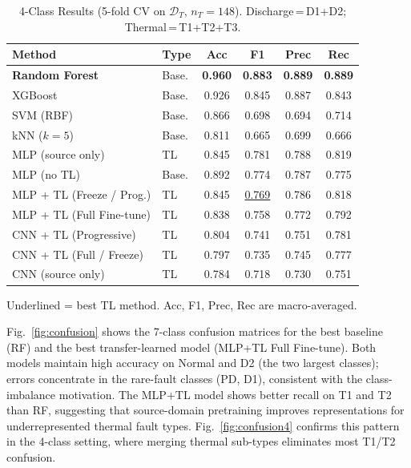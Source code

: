 \documentclass[conference]{IEEEtran}
\begin{document}
\begin{table}[t]
  \centering
  \caption{4-Class Results (5-fold CV on $\mathcal{D}_T$, $n_T=148$).
           Discharge\,=\,D1+D2; Thermal\,=\,T1+T2+T3.}
  \label{tab:results4}
  \setlength{\tabcolsep}{4pt}
  \begin{tabular}{llcccc}
    \toprule
    Method & Type & Acc & F1 & Prec & Rec \\
    \midrule
    \textbf{Random Forest}        & Base. & \textbf{0.960} & \textbf{0.883} & \textbf{0.889} & \textbf{0.889} \\
    XGBoost                       & Base. & 0.926 & 0.845 & 0.887 & 0.843 \\
    SVM (RBF)                     & Base. & 0.866 & 0.698 & 0.694 & 0.714 \\
    kNN ($k=5$)                   & Base. & 0.811 & 0.665 & 0.699 & 0.666 \\
    \midrule
    MLP (source only)             & TL    & 0.845 & 0.781 & 0.788 & 0.819 \\
    MLP (no TL)                   & Base. & 0.892 & 0.774 & 0.787 & 0.775 \\
    MLP + TL (Freeze / Prog.)     & TL    & 0.845 & \underline{0.769} & 0.786 & 0.818 \\
    MLP + TL (Full Fine-tune)     & TL    & 0.838 & 0.758 & 0.772 & 0.792 \\
    CNN + TL (Progressive)        & TL    & 0.804 & 0.741 & 0.751 & 0.781 \\
    CNN + TL (Full / Freeze)      & TL    & 0.797 & 0.735 & 0.745 & 0.777 \\
    CNN (source only)             & TL    & 0.784 & 0.718 & 0.730 & 0.751 \\
    \bottomrule
  \end{tabular}
  \vspace{1pt}
  \small{Underlined = best TL method. Acc, F1, Prec, Rec are macro-averaged.}
\end{table}

Fig.~\ref{fig:confusion} shows the 7-class confusion matrices for
the best baseline (RF) and the best transfer-learned model
(MLP+TL Full Fine-tune).
Both models maintain high accuracy on Normal and D2 (the two
largest classes); errors concentrate in the rare-fault classes
(PD, D1), consistent with the class-imbalance motivation.
The MLP+TL model shows better recall on T1 and T2 than RF,
suggesting that source-domain pretraining improves representations
for underrepresented thermal fault types.
Fig.~\ref{fig:confusion4} confirms this pattern in the 4-class
setting, where merging thermal sub-types eliminates most T1/T2
confusion.
\end{document}
